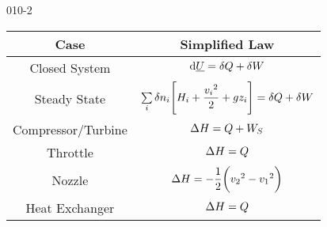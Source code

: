 \begin{mitframe}{010-2}


	\begin{tabular}{|c|c|}
	\hline
	Case & Simplified Law \\ \hline
    Closed System & $\mathrm{d}\uline{\intenergy}=\blthick\heatflow+\blthick\work$ \\ \hline
    Steady State & $\sum\limits_{\state}\blthick n_{\state}\Bigg[\enthalpy_{\state}+\dfrac{{\vvel_{\state}}^{2}}{2}+\grav\heightz_{\state}\Bigg]=\blthick\heatflow+\blthick\work$ \\ \hline
   	Compressor/Turbine & $\iipf\enthalpy=\heatflow+\work_{\entropy}$ \\ \hline 
    Throttle & $\iipf\enthalpy=\heatflow$ \\ \hline
    Nozzle & $\iipf\enthalpy=-\dfrac{1}{2}\bigg({\vvel_{2}}^{2}-{\vvel_{1}}^{2}\bigg)$\\ \hline
    Heat Exchanger & $\iipf\enthalpy=\heatflow$ \\ \hline
    
    \end{tabular}

\end{mitframe}